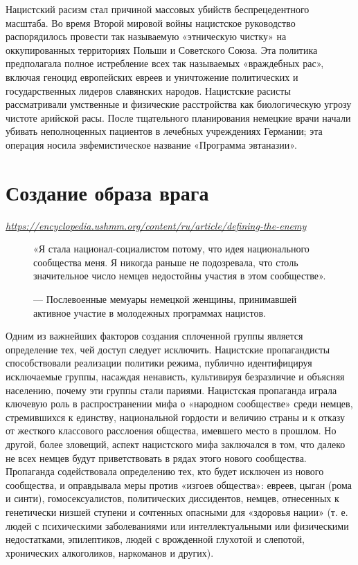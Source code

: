 Нацистский расизм стал причиной массовых убийств беспрецедентного масштаба. Во время Второй мировой войны нацистское руководство распорядилось провести так называемую «этническую чистку» на оккупированных территориях Польши и Советского Союза. Эта политика предполагала полное истребление всех так называемых «враждебных рас», включая геноцид европейских евреев и уничтожение политических и государственных лидеров славянских народов. Нацистские расисты рассматривали умственные и физические расстройства как биологическую угрозу чистоте арийской расы. После тщательного планирования немецкие врачи начали убивать неполноценных пациентов в лечебных учреждениях Германии; эта операция носила эвфемистическое название «Программа эвтаназии».

\newpage
\section{Создание образа врага}

\textit{\url{https://encyclopedia.ushmm.org/content/ru/article/defining-the-enemy}}

\begin{figure}
    \begin{fancyquotes}
        «Я стала национал-социалистом потому, что идея национального сообщества  меня. Я никогда раньше не подозревала, что столь значительное число немцев недостойны участия в этом сообществе».\\[1em]

        \begin{flushright}
            --- Послевоенные мемуары немецкой женщины, принимавшей активное участие в молодежных программах нацистов.
        \end{flushright}
    \end{fancyquotes}
\end{figure}
Одним из важнейших факторов создания сплоченной группы является определение тех, чей доступ следует исключить. Нацистские пропагандисты способствовали реализации политики режима, публично идентифицируя исключаемые группы, насаждая ненависть, культивируя безразличие и объясняя населению, почему эти группы стали париями. Нацистская пропаганда играла ключевую роль в распространении мифа о «народном сообществе» среди немцев, стремившихся к единству, национальной гордости и величию страны и к отказу от жесткого классового расслоения общества, имевшего место в прошлом. Но другой, более зловещий, аспект нацистского мифа заключался в том, что далеко не всех немцев будут приветствовать в рядах этого нового сообщества. Пропаганда содействовала определению тех, кто будет исключен из нового сообщества, и оправдывала меры против «изгоев общества»: евреев, цыган (рома и синти), гомосексуалистов, политических диссидентов, немцев, отнесенных к генетически низшей ступени и сочтенных опасными для «здоровья нации» (т. е. людей с психическими заболеваниями или интеллектуальными или физическими недостатками, эпилептиков, людей с врожденной глухотой и слепотой, хронических алкоголиков, наркоманов и других).

